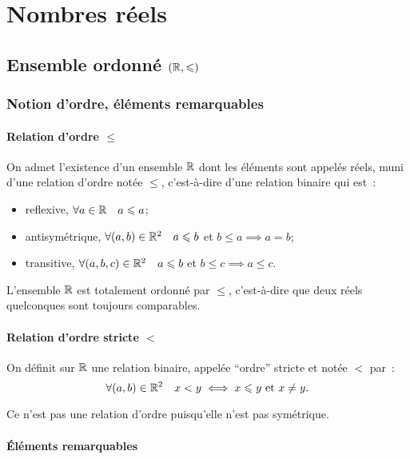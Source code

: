 \chapter{Nombres réels}\label{chap:reels}
\minitoc%
\minilof%
\minilot%
\section{Ensemble ordonné \((\mathbb{R}, \leqslant)\)}

\subsection{Notion d'ordre, éléments remarquables}

\subsubsection{Relation d'ordre \(\leqslant\)}

On admet l'existence d'un ensemble \(\mathbb{R}\) dont les éléments sont appelés réels,
muni d'une relation d'ordre notée \(\leqslant\), c'est-à-dire d'une relation
binaire qui est~:
\begin{itemize}
  \item reflexive, \(\forall a \in \mathbb{R} \quad a\leqslant a\);
  \item antisymétrique, \(\forall (a, b) \in \mathbb{R}^2 \quad a\leqslant b\) et \(
    b\leqslant a \implies a = b\);
  \item transitive, \(\forall (a, b, c) \in \mathbb{R}^2 \quad a\leqslant b\) et
    \(b\leqslant c \implies a\leqslant c\).
\end{itemize}
L'ensemble \(\mathbb{R}\) est totalement ordonné par \(\leqslant\), c'est-à-dire que
deux réels quelconques sont toujours comparables.

\subsubsection{Relation d'ordre stricte \(<\)}

\begin{defdef}
  On définit sur \(\mathbb{R}\) une relation binaire, appelée ``ordre'' stricte et notée
  \(<\) par~:
  \begin{equation}
    \forall (a, b) \in \mathbb{R}^2 \quad x<y \iff x\leqslant y \text{~et~} x\neq y.
  \end{equation}
\end{defdef}
Ce n'est pas une relation d'ordre puisqu'elle n'est pas symétrique.

\subsubsection{Éléments remarquables}

